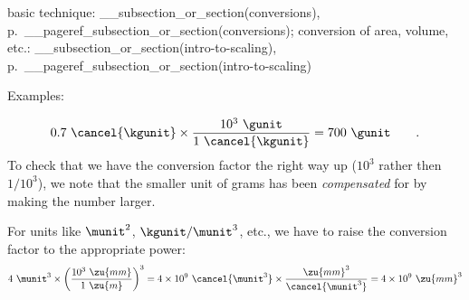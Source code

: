 basic technique: __subsection_or_section(conversions), p.~__pageref_subsection_or_section(conversions);
conversion of area, volume, etc.: __subsection_or_section(intro-to-scaling), p.~__pageref_subsection_or_section(intro-to-scaling)

Examples:

\begin{equation*}
  0.7\ \cancel{\kgunit} \times \frac{10^3\ \gunit}{1\ \cancel{\kgunit}}  = 700\ \gunit   \qquad   .
\end{equation*}
To check that we have the conversion factor the right way up ($10^3$ rather then $1/10^3$), we note
that the smaller unit of grams has been \emph{compensated} for by making the number larger.

For units like $\munit^2$, $\kgunit/\munit^3$, etc., we have to raise the conversion factor to the appropriate power:
\begin{equation*}
  4\ \munit^3 \times \left(\frac{10^3\ \zu{mm}}{1\ \zu{m}}\right)^3 = 4\times10^9\ \cancel{\munit^3} \times \frac{\zu{mm}^3}{\cancel{\munit^3}} = 4\times10^9\ \zu{mm}^3
\end{equation*}
